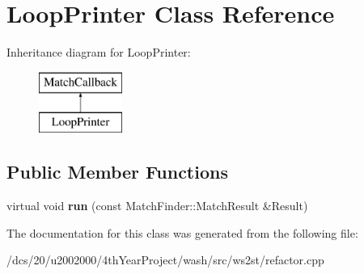 \hypertarget{classLoopPrinter}{}\section{Loop\+Printer Class Reference}
\label{classLoopPrinter}
Inheritance diagram for Loop\+Printer\+:\begin{figure}[H]
\begin{center}
\leavevmode
\includegraphics[height=2.000000cm]{classLoopPrinter}
\end{center}
\end{figure}
\subsection*{Public Member Functions}
\begin{DoxyCompactItemize}
\item 
\mbox{\label{classLoopPrinter_ae59e0b9aaac96e2e564706ff060e0c57}} 
virtual void {\bfseries run} (const Match\+Finder\+::\+Match\+Result \&Result)
\end{DoxyCompactItemize}


The documentation for this class was generated from the following file\+:\begin{DoxyCompactItemize}
\item 
/dcs/20/u2002000/4th\+Year\+Project/wash/src/ws2st/refactor.\+cpp\end{DoxyCompactItemize}
